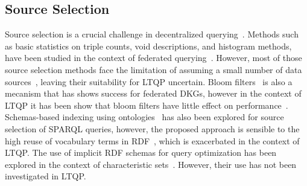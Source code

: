 \subsection{Source Selection}
Source selection is a crucial challenge in decentralized querying~\cite{hose2012towards, Harth2010}.
Methods such as basic statistics on triple counts, void descriptions, and histogram methods, have been studied in the context of federated querying~\cite{hose2012towards, Harth2010, Montoya2017}.
However, most of those source selection methods face the limitation of assuming a small number of data sources~\cite{Harth2010}, leaving their suitability for LTQP uncertain.
Bloom filters~\cite{dia2018fast} is also a mecanism that has shows success for federated DKGs, however in the context of LTQP it has been show that bloom filters have little effect on performance~\cite{Hanski2024}.
Schemas-based indexing using ontologies~\cite{Stuckenschmidt2004} has also been explored for source selection of SPARQL queries,
however, the proposed approach is sensible to the high reuse of vocabulary terms in RDF~\cite{Harth2010}, which is exacerbated in the context of LTQP.
The use of implicit RDF schemas for query optimization has been explored in the context of characteristic sets~\cite{Neumann2011CharacteristicSA, Meimaris2017ExtendedCS, Montoya2017}.
However, their use has not been investigated in LTQP.